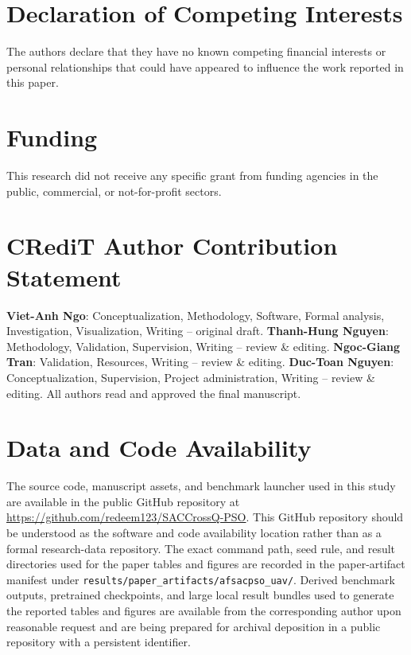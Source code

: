\documentclass[final,5p,times]{elsarticle}
\begin{document}
\section*{Declaration of Competing Interests}
The authors declare that they have no known competing financial interests or personal relationships that could have appeared to influence the work reported in this paper.

\section*{Funding}
This research did not receive any specific grant from funding agencies in the public, commercial, or not-for-profit sectors.

\section*{CRediT Author Contribution Statement}
\textbf{Viet-Anh Ngo}: Conceptualization, Methodology, Software, Formal analysis, Investigation, Visualization, Writing -- original draft. \textbf{Thanh-Hung Nguyen}: Methodology, Validation, Supervision, Writing -- review \& editing. \textbf{Ngoc-Giang Tran}: Validation, Resources, Writing -- review \& editing. \textbf{Duc-Toan Nguyen}: Conceptualization, Supervision, Project administration, Writing -- review \& editing. All authors read and approved the final manuscript.

\section*{Data and Code Availability}
The source code, manuscript assets, and benchmark launcher used in this study are available in the public GitHub repository at \href{https://github.com/redeem123/SACCrossQ-PSO}{https://github.com/redeem123/SACCrossQ-PSO}. This GitHub repository should be understood as the software and code availability location rather than as a formal research-data repository. The exact command path, seed rule, and result directories used for the paper tables and figures are recorded in the paper-artifact manifest under \texttt{results/paper\_artifacts/afsacpso\_uav/}. Derived benchmark outputs, pretrained checkpoints, and large local result bundles used to generate the reported tables and figures are available from the corresponding author upon reasonable request and are being prepared for archival deposition in a public repository with a persistent identifier.


\end{document}
